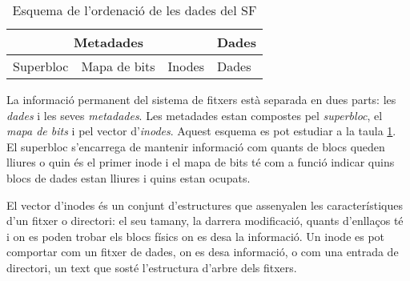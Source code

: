\begin{table}
\centering
\begin{tabular}{|l|l|l|l|}
\hline
\multicolumn{3}{|c|}{Metadades} & Dades \\
\hline
Superbloc & Mapa de bits & Inodes & Dades \\
\hline
\end{tabular}
\caption{Esquema de l'ordenació de les dades del SF}
\label{esquema}
\end{table}


La informació permanent del sistema de fitxers està separada en dues parts: les
\emph{dades} i les seves \emph{metadades}. Les metadades estan compostes pel
\emph{superbloc}, el \emph{mapa de bits} i pel vector d'\emph{inodes}.  Aquest
esquema es pot estudiar a la taula \ref{esquema}. El superbloc s'encarrega de
mantenir informació com quants de blocs queden lliures o quin és el primer
inode i el mapa de bits té com a funció indicar quins blocs de dades estan
lliures i quins estan ocupats.

El vector d'inodes és un conjunt d'estructures que assenyalen les
característiques d'un fitxer o directori: el seu tamany, la darrera
modificació, quants d'enllaços té i on es poden trobar els blocs físics on es
desa la informació.  Un inode es pot comportar com un fitxer de dades, on es
desa informació, o com una entrada de directori, un text que sosté l'estructura
d'arbre dels fitxers.
